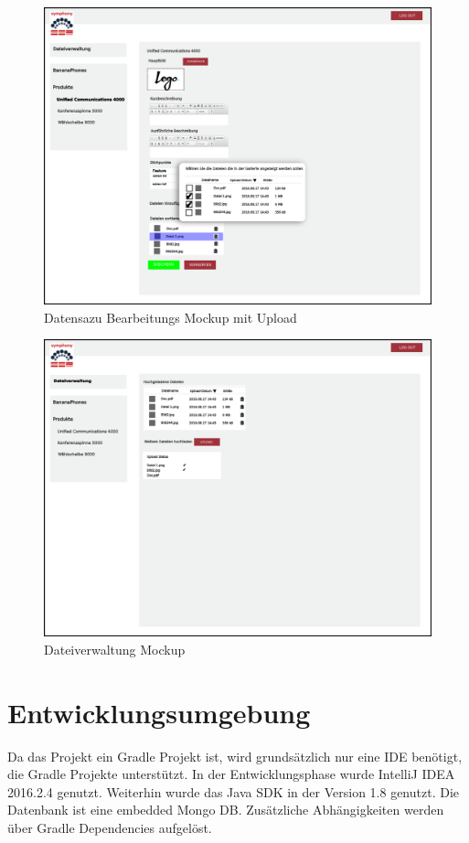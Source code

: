\documentclass[a4paper,12pt]{article}
\begin{document}
\begin{figure}[!htb]
  \centering
     \includegraphics[width=1.0\textwidth]{projmicro_edit_dateiauswahl.png}
  \caption{Datensazu Bearbeitungs Mockup mit Upload}
  \label{fig:edit_file}
\end{figure}

\begin{figure}[!htb]
  \centering
     \includegraphics[width=1.0\textwidth]{projmicro_upload.png}
  \caption{Dateiverwaltung Mockup}
  \label{fig:selection}
\end{figure}

\section{Entwicklungsumgebung}
Da das Projekt ein Gradle Projekt ist, wird grundsätzlich nur eine IDE benötigt, die Gradle Projekte unterstützt.
In der Entwicklungsphase wurde IntelliJ IDEA 2016.2.4 genutzt. Weiterhin wurde das Java SDK in der Version 1.8 genutzt.
Die Datenbank ist eine embedded Mongo DB.
Zusätzliche Abhängigkeiten werden über Gradle Dependencies aufgelöst.

\clearpage


\end{document}
